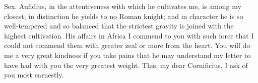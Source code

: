 

Sex. Aufidius, in the attentiveness with which he cultivates me, is among my closest; in distinction he yields to no Roman knight; and in character he is so well-tempered and so balanced that the strictest gravity is joined with the highest cultivation. His affairs in Africa I commend to you with such force that I could not commend them with greater zeal or more from the heart. You will do me a very great kindness if you take pains that he may understand my letter to have had with you the very greatest weight. This, my dear Cornificius, I ask of you most earnestly.
